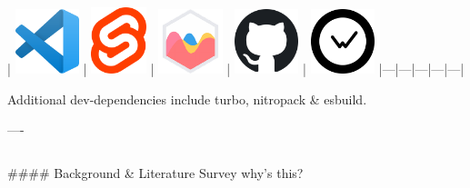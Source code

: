 \documentclass[]{beamer}
\begin{document}
\begin{frame}[fragile]
\begin{columns}
\begin{column}{.4\textwidth}
\begin{markdown}
| \hspace{0.05cm} \includegraphics[width=0.14\textwidth]{vscode_logo.png} | \hspace{0.06cm} \includegraphics[width=0.12\textwidth]{svelte_logo.png} | \includegraphics[width=0.14\textwidth]{chartjs_logo.png} | \includegraphics[width=0.14\textwidth,decodearray={1 0 1 0 1 0}]{github_logo.png} | \includegraphics[width=0.14\textwidth,decodearray={1 0 1 0 1 0}]{wakatime_logo.png}
|---|---|---|---|---|

\vspace{0.8cm}

{\footnotesize Additional dev-dependencies include turbo, nitropack \& esbuild.} 

----
\end{markdown}
\end{column}

\end{columns}

\medskip
{\hrulefill}
\medskip

\begin{markdown}

#### Background \& Literature Survey {\scriptsize why's this?}


\end{markdown}
\end{frame}
\end{document}
